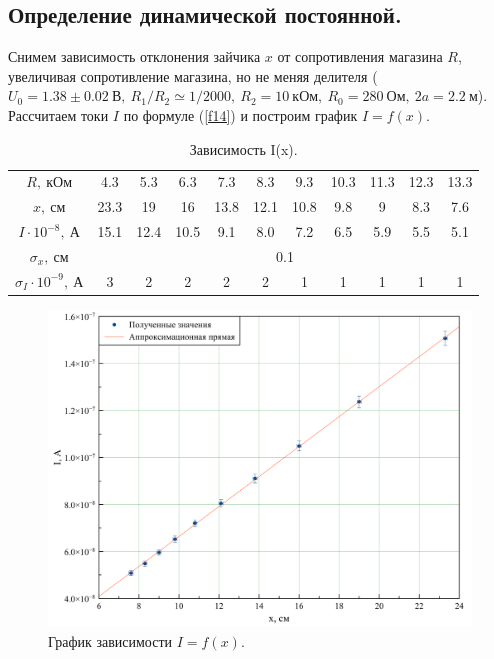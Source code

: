 \documentclass[a4paper, 12pt, twoside]{article}
\begin{document}
\subsection{Определение динамической постоянной.}
Снимем зависимость отклонения зайчика $x$ от сопротивления магазина $R$, увеличивая сопротивление магазина, но не меняя делителя ($U_0 = 1.38 \pm 0.02 ~\text{В},~ R_1/R_2 \simeq 1/2000,~R_2 = 10~\text{кОм},~R_0 = 280~\text{Ом},~2a = 2.2~\text{м}$). Рассчитаем токи $I$ по формуле (\ref{f14}) и построим график $I = f(x)$.
\begin{table}[H]
	\centering
	\caption{Зависимость I(x).}
	\label{t1}
	\begin{tabular}{c|cccccccccc}\toprule
		$R,~\text{кОм}$                  & 4.3  & 5.3  & 6.3  & 7.3  & 8.3  & 9.3  & 10.3 & 11.3 & 12.3 & 13.3 \\
		$x,~\text{см}$                   & 23.3 & 19   & 16   & 13.8 & 12.1 & 10.8 & 9.8  & 9    & 8.3  & 7.6  \\
		$I\cdot 10^{-8},~\text{А}$       & 15.1 & 12.4 & 10.5 & 9.1  & 8.0  & 7.2  & 6.5  & 5.9  & 5.5  & 5.1  \\ \midrule
		$\sigma_x,~\text{см}$            & \multicolumn{10}{c}{0.1}                                            \\
		$\sigma_I\cdot 10^{-9},~\text{А}$ & 3    & 2    & 2    & 2    & 2    & 1    & 1    & 1    & 1    & 1   \\ \bottomrule
	\end{tabular}
\end{table}
\begin{figure}[H]
	\centering
	\includegraphics[width = 0.9\linewidth]{grph1}
	\caption[h]{График зависимости $I=f(x).$}
\end{figure}
\end{document}
